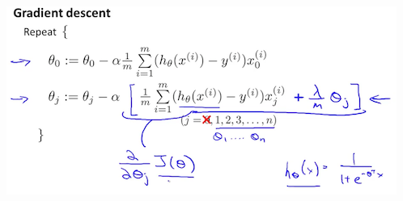 \documentclass[10pt,a4paper,UTF8]{article}
\begin{document}
\begin{center}
\includegraphics[width=.9\linewidth]{../../img/computer_ng/20171009gradientDescent.png}
\end{center}
\end{document}
